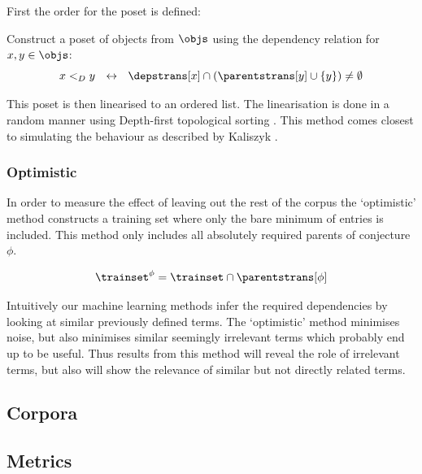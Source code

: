 First the order for the poset is defined:
\begin{definition}
  Construct a poset of objects from $\objs$ using the dependency relation for $x, y \in \objs$:
  \[
    x <_D y ~~\leftrightarrow~~ \depstrans[x] \cap (\parentstrans[y] \cup \{y\}) \neq \emptyset
  \]
\end{definition}

This poset is then linearised to an ordered list.
The linearisation is done in a random manner using Depth-first topological sorting \cite{tarjan1976edge}.
This method comes closest to simulating the behaviour as described by Kaliszyk \cite{kaliszyk2014machine}.

\subsubsection{Optimistic}

In order to measure the effect of leaving out the rest of the corpus
the `optimistic' method constructs a training set where only the bare minimum of entries is included.
This method only includes all absolutely required parents of conjecture $\phi$.

\begin{definition}
  \[
    \trainset^{\phi} = \trainset \cap \parentstrans[\phi]
  \]
\end{definition}

Intuitively our machine learning methods infer the required dependencies by looking at similar previously defined terms.
The `optimistic' method minimises noise, but also minimises similar seemingly irrelevant terms which probably end up to be useful.
Thus results from this method will reveal the role of irrelevant terms, but also will show the relevance of similar but not directly related terms.

\subsection{Corpora}
\label{section:corpora}


\subsection{Metrics}
\label{section:metrics}

